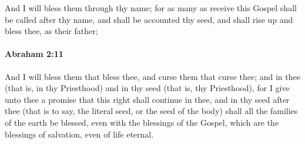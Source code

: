			And I will bless them through thy name; for as many as receive this Gospel shall be called after thy name, and shall be accounted thy seed, and shall rise up and bless thee, as their father;


		\paragraph{Abraham 2:11} %
			\label{ABRAHAM-2-11}

			And I will bless them that bless thee, and curse them that curse thee; and in thee (that is, in thy Priesthood) and in thy seed (that is, thy Priesthood), for I give unto thee a promise that this right shall continue in thee, and in thy seed after thee (that is to say, the literal seed, or the seed of the body) shall all the families of the earth be blessed, even with the blessings of the Gospel, which are the blessings of salvation, even of life eternal.


